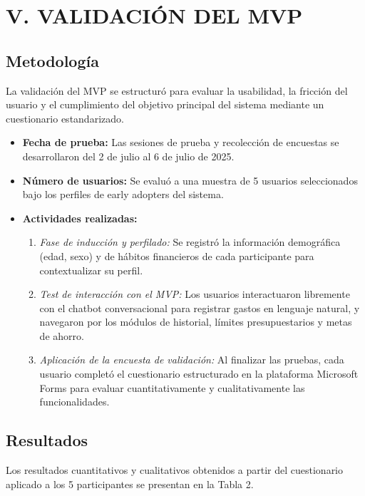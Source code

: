 \documentclass[12pt]{article}
\begin{document}
\newpage

\section{V. VALIDACIÓN DEL MVP}

\subsection{Metodología}
La validación del MVP se estructuró para evaluar la usabilidad, la fricción del usuario y el cumplimiento del objetivo principal del sistema mediante un cuestionario estandarizado.
\begin{itemize}
    \item \textbf{Fecha de prueba:} Las sesiones de prueba y recolección de encuestas se desarrollaron del 2 de julio al 6 de julio de 2025.
    \item \textbf{Número de usuarios:} Se evaluó a una muestra de 5 usuarios seleccionados bajo los perfiles de early adopters del sistema.
    \item \textbf{Actividades realizadas:}
    \begin{enumerate}
        \item \textit{Fase de inducción y perfilado:} Se registró la información demográfica (edad, sexo) y de hábitos financieros de cada participante para contextualizar su perfil.
        \item \textit{Test de interacción con el MVP:} Los usuarios interactuaron libremente con el chatbot conversacional para registrar gastos en lenguaje natural, y navegaron por los módulos de historial, límites presupuestarios y metas de ahorro.
        \item \textit{Aplicación de la encuesta de validación:} Al finalizar las pruebas, cada usuario completó el cuestionario estructurado en la plataforma Microsoft Forms para evaluar cuantitativamente y cualitativamente las funcionalidades.
    \end{enumerate}
\end{itemize}

\subsection{Resultados}
Los resultados cuantitativos y cualitativos obtenidos a partir del cuestionario aplicado a los 5 participantes se presentan en la Tabla 2.
\end{document}
